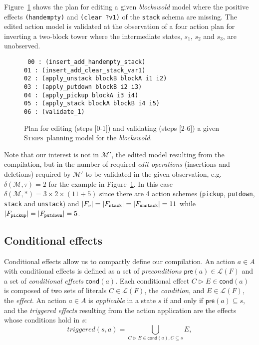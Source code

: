 \documentclass[letterpaper]{article} %
\newcommand{\pre}{\mathsf{pre}}     %
\newcommand{\cond}{\mathsf{cond}}   %
\newcommand{\strips}{\textsc{Strips}}     %
\begin{document}
Figure~\ref{fig:plan-pdistance} shows the plan for editing a given {\em blockswold} model where the positive effects {\tt\small (handempty)} and {\tt\small (clear ?v1)} of the {\tt\small stack} schema are missing. The edited action model is validated at the observation of a four action plan for inverting a two-block tower where the intermediate states, $s_1$, $s_2$ and $s_3$, are unobserved. 
\begin{figure}
{\tt\scriptsize
00 : (insert\_add\_handempty\_stack)\\
01 : (insert\_add\_clear\_stack\_var1)\\
02 : (apply\_unstack blockB blockA i1 i2)\\
03 : (apply\_putdown blockB i2 i3)\\
04 : (apply\_pickup blockA i3 i4)\\
05 : (apply\_stack blockA blockB i4 i5)\\
06 : (validate\_1)
}
 \caption{\small Plan for editing (steps [0-1]) and validating (steps [2-6]) a given \strips\ planning model for the {\em blockswold}.}
\label{fig:plan-pdistance}
\end{figure}

Note that our interest is not in $\mathcal{M}'$, the edited model resulting from the compilation, but in the number of required {\em edit operations} (insertions and deletions) required by $\mathcal{M}'$ to be validated in the given observation, e.g. $\delta(\mathcal{M},\tau)=2$ for the example in Figure~\ref{fig:plan-pdistance}. In this case $\delta(\mathcal{M},*)=3\times 2\times (11+5)$ since there are 4 action schemes ({\small\tt pickup}, {\small\tt putdown}, {\small\tt stack} and {\small\tt unstack}) and $|F_v|=|F_{\tt stack}|=|F_{\tt unstack}|=11$ while $|F_{\tt pickup}|=|F_{\tt putdown}|=5$. %


\subsection{Conditional effects}
Conditional effects allow us to compactly define our compilation. An action $a\in A$ with conditional effects is defined as a set of {\em preconditions} $\pre(a)\in\mathcal{L}(F)$ and a set of {\em conditional effects} $\cond(a)$. Each conditional effect $C\rhd E\in\cond(a)$ is composed of two sets of literals $C\in\mathcal{L}(F)$, the {\em condition}, and $E\in\mathcal{L}(F)$, the {\em effect}. An action $a\in A$ is {\em applicable} in a state $s$ if and only if $\pre(a)\subseteq s$, and the {\em triggered effects} resulting from the action application are the effects whose conditions hold in $s$:
\[
triggered(s,a)=\bigcup_{C\rhd E\in\cond(a),C\subseteq s} E,
\]
\end{document}

